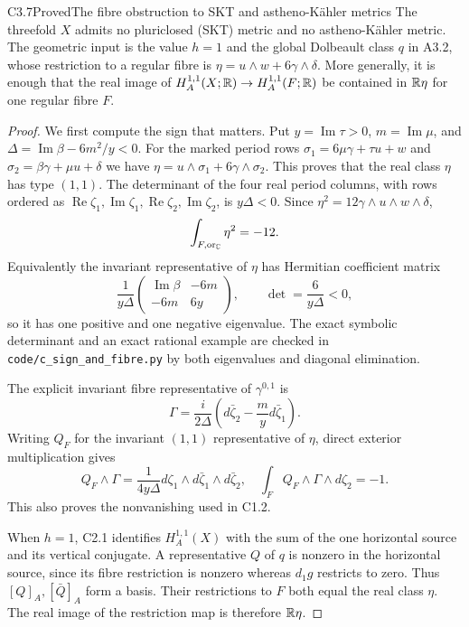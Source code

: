 \begin{claim}{C3.7}{Proved}{The fibre obstruction to SKT and astheno-K\"ahler metrics}
The threefold $X$ admits no pluriclosed (SKT) metric and no
astheno-K\"ahler metric.  The geometric input is the value $h=1$
and the global Dolbeault class $q$ in A3.2, whose restriction to a
regular fibre is $\eta=u\wedge w+6\gamma\wedge\delta$.
More generally, it is enough that the real image of
$H_A^{1,1}(X;\mathbb R)\to H_A^{1,1}(F;\mathbb R)$ be contained in
$\mathbb R\eta$ for one regular fibre $F$.
\end{claim}
\begin{proof}
We first compute the sign that matters.  Put
$y=\operatorname{Im}\tau>0$, $m=\operatorname{Im}\mu$, and
$\Delta=\operatorname{Im}\beta-6m^2/y<0$.
For the marked period rows
$\sigma_1=6\mu\gamma+\tau u+w$ and
$\sigma_2=\beta\gamma+\mu u+\delta$ we have
$\eta=u\wedge\sigma_1+6\gamma\wedge\sigma_2$.
This proves that the real class $\eta$ has type $(1,1)$.
The determinant of the four real period columns, with rows ordered
as $\operatorname{Re}\zeta_1,\operatorname{Im}\zeta_1,
\operatorname{Re}\zeta_2,\operatorname{Im}\zeta_2$, is
$y\Delta<0$.  Since $\eta^2=12\gamma\wedge u\wedge w\wedge\delta$,
\begin{equation}\label{eq:C-eta-negative}
\int_{F,\mathrm{or}_{\mathbb C}}\eta^2=-12.
\end{equation}
Equivalently the invariant representative of $\eta$ has Hermitian
coefficient matrix
\[
\frac1{y\Delta}
\begin{pmatrix}\operatorname{Im}\beta&-6m\\-6m&6y\end{pmatrix},
\qquad \det=\frac6{y\Delta}<0,
\]
so it has one positive and one negative eigenvalue.  The exact
symbolic determinant and an exact rational example are checked in
\texttt{code/c\_sign\_and\_fibre.py} by both eigenvalues and
diagonal elimination.

The explicit invariant fibre representative of $\gamma^{0,1}$ is
\[
\Gamma=\frac{i}{2\Delta}
\left(d\bar\zeta_2-\frac myd\bar\zeta_1\right).
\]
Writing $Q_F$ for the invariant $(1,1)$ representative of $\eta$,
direct exterior multiplication gives
\[
Q_F\wedge\Gamma=
\frac1{4y\Delta}
d\zeta_1\wedge d\bar\zeta_1\wedge d\bar\zeta_2,
\quad
\int_FQ_F\wedge\Gamma\wedge d\zeta_2=-1.
\]
This also proves the nonvanishing used in C1.2.

When $h=1$, C2.1 identifies $H_A^{1,1}(X)$ with the sum of the
one horizontal source and its vertical conjugate.  A representative
$Q$ of $q$ is nonzero in the horizontal source, since its fibre
restriction is nonzero whereas $d_1g$ restricts to zero.  Thus
$[Q]_A,[\bar Q]_A$ form a basis.  Their restrictions to $F$ both
equal the real class $\eta$.  The real image of the restriction map
is therefore $\mathbb R\eta$.


\end{proof}
